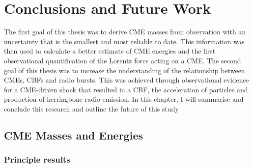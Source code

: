 
\singlespacing
\chapter{Conclusions and Future Work} 

\label{chap:6}

\doublespacing
The first goal of this thesis was to derive CME masses from observation with an uncertainty that is the smallest and most reliable to date. This information was then used to calculate a better estimate of CME energies and the first observational quantification of the Lorentz force acting on a CME. 
The second goal of this thesis was to increase the understanding of the relationship between CMEs, CBFs and radio bursts. This was achieved through observational evidence for a CME-driven shock that resulted in a CBF, the acceleration of particles and production of herringbone radio emission. In this chapter, I will summarise and conclude this research and outline the future of this study
\clearpage

\section{CME Masses and Energies}

\subsection{Principle results}

